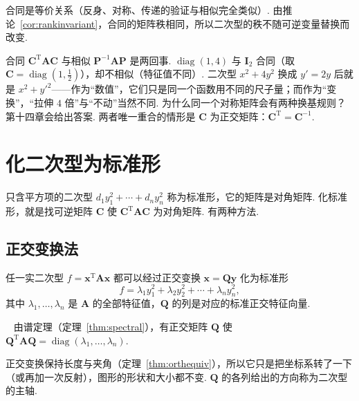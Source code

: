 \documentclass[lang=cn,10.5pt,scheme=chinese,toc=twocol,section,chinesefont=nofont,
twoside,citestyle=gb7714-2015,bibstyle=gb7714-2015]{elegantbook}
\DeclareRobustCommand{\textbf}[1]{{\lnsemiboldlatin\lnsemiboldcjk #1}}
\newcommand{\vv}[1]{\boldsymbol{#1}}
\newcommand{\trans}{\mathrm{T}}             %
\numberwithin{equation}{section}   %
\newcommand{\diag}{\operatorname{diag}}
\newcommand*{\lnlabel}[1]{{\sffamily\bfseries\color{black}#1}}
\renewenvironment{proof}{%
	\par\noindent\lnlabel{\proofname}\;\ \color{black!90}\cfs}{\par}
\begin{document}
合同是等价关系（反身、对称、传递的验证与相似完全类似）. 由推论~\ref{cor:rankinvariant}，合同的矩阵秩相同，所以\textbf{二次型的秩不随可逆变量替换而改变}.

\begin{pitfallbox}
  合同 $\vv C^\trans\vv A\vv C$ 与相似 $\vv P^{-1}\vv A\vv P$ 是两回事. $\diag(1,4)$ 与 $\vv I_2$ 合同（取 $\vv C=\diag(1,\frac12)$），却不相似（特征值不同）. 二次型 $x^2+4y^2$ 换成 $y'=2y$ 后就是 $x^2+y'^2$——作为“数值”，它们只是同一个函数用不同的尺子量；而作为“变换”，“拉伸 $4$ 倍”与“不动”当然不同. 为什么同一个对称矩阵会有两种换基规则？第十四章会给出答案. 两者唯一重合的情形是 $\vv C$ 为正交矩阵：$\vv C^\trans=\vv C^{-1}$.
\end{pitfallbox}

\section{化二次型为标准形}

只含平方项的二次型 $d_1y_1^2+\cdots+d_ny_n^2$ 称为\textbf{标准形}，它的矩阵是对角矩阵. 化标准形，就是找可逆矩阵 $\vv C$ 使 $\vv C^\trans\vv A\vv C$ 为对角矩阵. 有两种方法.

\subsection{正交变换法}

\begin{theorem}[主轴定理]\label{thm:principalaxes}
  任一实二次型 $f=\vv x^\trans\vv A\vv x$ 都可以经过\textbf{正交变换} $\vv x=\vv Q\vv y$ 化为标准形
  \[f=\lambda_1y_1^2+\lambda_2y_2^2+\cdots+\lambda_ny_n^2,\]
  其中 $\lambda_1,\ldots,\lambda_n$ 是 $\vv A$ 的全部特征值，$\vv Q$ 的列是对应的标准正交特征向量.
\end{theorem}
\begin{proof}
  由谱定理（定理~\ref{thm:spectral}），有正交矩阵 $\vv Q$ 使 $\vv Q^\trans\vv A\vv Q=\diag(\lambda_1,\ldots,\lambda_n)$.
\end{proof}

正交变换保持长度与夹角（定理~\ref{thm:orthequiv}），所以它只是把坐标系\textbf{转了一下}（或再加一次反射），图形的形状和大小都不变. $\vv Q$ 的各列给出的方向称为二次型的\textbf{主轴}.
\end{document}
